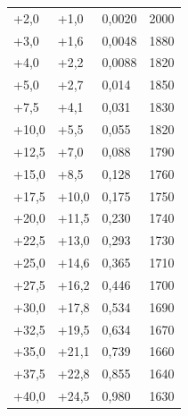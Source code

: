 \documentclass{scrartcl}
\begin{document}
\begin{table}[H]
\begin{center}
\begin{tabular}{l|l|l|l}
+2,0    &   +1,0    &   0,0020  &   2000 \\
+3,0    &   +1,6    &   0,0048  &   1880 \\
+4,0    &   +2,2    &   0,0088  &   1820 \\
+5,0    &   +2,7    &   0,014   &   1850 \\
+7,5    &   +4,1    &   0,031   &   1830 \\
+10,0   &   +5,5    &   0,055   &   1820 \\
+12,5   &   +7,0    &   0,088   &   1790 \\
+15,0   &   +8,5    &   0,128   &   1760 \\
+17,5   &   +10,0   &   0,175   &   1750 \\
+20,0   &   +11,5   &   0,230   &   1740 \\
+22,5   &   +13,0   &   0,293   &   1730 \\
+25,0   &   +14,6   &   0,365   &   1710 \\
+27,5   &   +16,2   &   0,446   &   1700 \\
+30,0   &   +17,8   &   0,534   &   1690 \\
+32,5   &   +19,5   &   0,634   &   1670 \\
+35,0   &   +21,1   &   0,739   &   1660 \\
+37,5   &   +22,8   &   0,855   &   1640 \\
+40,0   &   +24,5   &   0,980   &   1630 
\end{tabular}
\end{center}
\label{tab:Metallfadenlampe}
\end{table}
\end{document}

